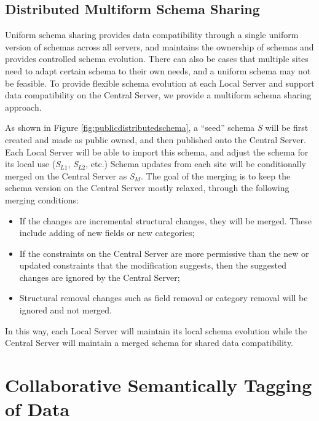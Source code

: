 \documentclass{singlecol-new}
\theoremstyle{TH}{
\newtheorem{lemma}{Lemma}
\newtheorem{theorem}[lemma]{Theorem}
\newtheorem{corrolary}[lemma]{Corrolary}
\newtheorem{conjecture}[lemma]{Conjecture}
\newtheorem{proposition}[lemma]{Proposition}
\newtheorem{claim}[lemma]{Claim}
\newtheorem{stheorem}[lemma]{Wrong Theorem}
\newtheorem{algorithm}{Algorithm}
}
\theoremstyle{THrm}{
\newtheorem{definition}{Definition}[section]
\newtheorem{question}{Question}[section]
\newtheorem{remark}{Remark}
\newtheorem{scheme}{Scheme}
}
\theoremstyle{THhit}{
\newtheorem{case}{Case}[section]
}
\begin{document}
\subsection{Distributed Multiform Schema Sharing} \label{sec:multiformschema}

Uniform schema sharing provides data compatibility through a single
uniform version of schemas across all servers, and maintains the
ownership of schemas and provides controlled schema evolution. There
can also be cases that multiple sites need to adapt certain schema
to their own needs, and a uniform schema may not be feasible. To
provide flexible schema evolution at each Local Server and support
data compatibility on the Central Server, we provide a multiform
schema sharing approach.

As shown in Figure \ref{fig:publicdistributedschema}, a ``seed'' schema {\em
S} will be first created and made as public owned, and then published onto the
Central Server. Each Local Server will be able to import this schema, and
adjust the schema for its local use ({\em S$_{L1}$}, {\em S$_{L2}$}, etc.)
Schema updates from each site will be conditionally merged on the Central
Server as {\em S$_M$}. The goal of the merging  is to keep the schema version
on the Central Server mostly relaxed, through the following merging
conditions:

\begin{itemize}
  \item If the changes are incremental structural changes, they will be merged. These include
  adding of new fields or new categories;
  \item If the constraints on the Central Server are more permissive
   than the new or updated constraints that the modification suggests,
   then the suggested changes are ignored by the Central Server;
  \item Structural removal changes such as field removal or category removal
  will be ignored and not merged.
\end{itemize}


In this way, each Local Server will maintain its local schema evolution while
the Central Server will maintain a merged schema for shared data
compatibility.




\section{Collaborative Semantically Tagging of Data}\label{sec:tag}
\end{document}
